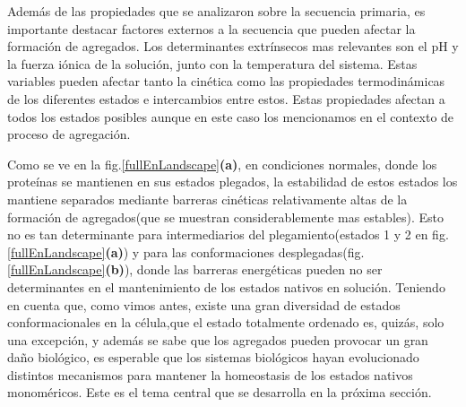 Además de las propiedades que se analizaron sobre la secuencia primaria, es importante destacar factores externos a la secuencia que pueden afectar la formación de agregados.
Los determinantes extrínsecos mas relevantes son el pH y la fuerza iónica de la solución, junto con la temperatura del sistema.
Estas variables pueden afectar tanto la cinética como las propiedades termodinámicas de los diferentes estados e intercambios entre estos.
Estas propiedades afectan a todos los estados posibles aunque en este caso los mencionamos en el contexto de proceso de agregación.



Como se ve en la fig.\ref{fullEnLandscape}\textbf{(a)}, en condiciones normales, donde los proteínas se mantienen en sus estados plegados, 
la estabilidad de estos estados los mantiene separados mediante barreras cinéticas relativamente altas de la formación de agregados(que se muestran considerablemente mas estables).
Esto no es tan determinante para intermediarios del plegamiento(estados 1 y 2 en fig. \ref{fullEnLandscape}\textbf{(a)}) y para las conformaciones desplegadas(fig. \ref{fullEnLandscape}\textbf{(b)}), 
donde las barreras energéticas pueden no ser determinantes en el mantenimiento de los estados nativos en solución.
Teniendo en cuenta que, como vimos antes, existe una gran diversidad de estados conformacionales en la célula,que el estado totalmente ordenado es, quizás, solo una excepción, y además se sabe que los agregados pueden provocar un gran daño biológico,
es esperable que los sistemas biológicos hayan evolucionado distintos mecanismos para mantener la homeostasis de los estados nativos monoméricos.
Este es el tema central que se desarrolla en la próxima sección.




